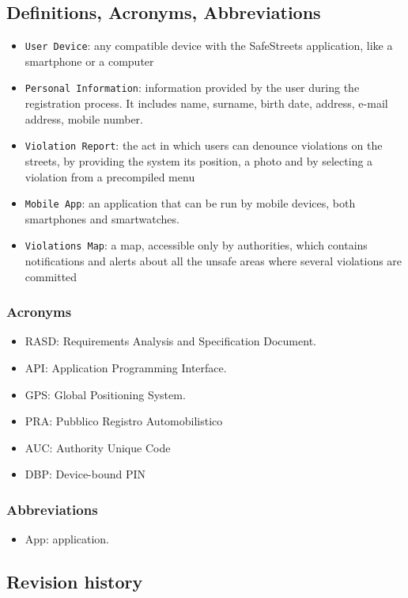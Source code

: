\documentclass[12pt,a4paper]{article}
\begin{document}
\subsection{Definitions, Acronyms, Abbreviations}
			\begin{itemize}
				\item \texttt{User Device}: any compatible device with the SafeStreets application, like a smartphone or a computer
				\item \texttt{Personal Information}: information provided by the user during the registration process. It includes name, surname, birth date, address, e-mail address, mobile number.
				\item \texttt{Violation Report}: the act in which users can denounce violations on the streets, by providing the system its position, a photo and by selecting a violation from a precompiled menu
				\item \texttt{Mobile App}: an application that can be run by mobile devices, both smartphones and smartwatches.
				\item \texttt{Violations Map}: a map, accessible only by authorities, which contains notifications and alerts about all the unsafe areas where several violations are committed
			\end{itemize}
		\subsubsection{Acronyms}
			\begin{itemize}
				\item RASD: Requirements Analysis and Specification Document.
				\item API: Application Programming Interface.
				\item GPS: Global Positioning System.
				\item PRA: Pubblico Registro Automobilistico
				\item AUC: Authority Unique Code
				\item DBP: Device-bound PIN
			\end{itemize}
		\subsubsection{Abbreviations}
			\begin{itemize}
				\item {App}: application.
			\end{itemize}
\subsection{Revision history} 
\end{document}
